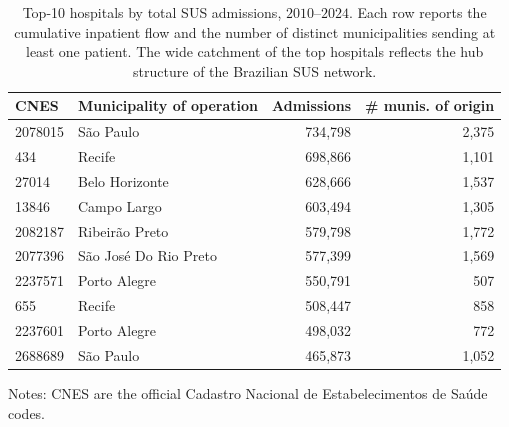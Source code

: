 \begin{table}[ht]
\centering
\caption{Top-10 hospitals by total SUS admissions, $2010\text{--}2024$. Each row reports the cumulative inpatient flow and the number of distinct municipalities sending at least one patient. The wide catchment of the top hospitals reflects the hub structure of the Brazilian SUS network.}
\label{tab:tophosp}
\small
\begin{tabular}{llrr}
\toprule
CNES & Municipality of operation & Admissions & \# munis. of origin \\
\midrule
  2078015 & São Paulo & 734,798 & 2,375 \\
  434 & Recife & 698,866 & 1,101 \\
  27014 & Belo Horizonte & 628,666 & 1,537 \\
  13846 & Campo Largo & 603,494 & 1,305 \\
  2082187 & Ribeirão Preto & 579,798 & 1,772 \\
  2077396 & São José Do Rio Preto & 577,399 & 1,569 \\
  2237571 & Porto Alegre & 550,791 & 507 \\
  655 & Recife & 508,447 & 858 \\
  2237601 & Porto Alegre & 498,032 & 772 \\
  2688689 & São Paulo & 465,873 & 1,052 \\
\bottomrule
\end{tabular}
\medskip

\footnotesize
Notes: CNES are the official Cadastro Nacional de Estabelecimentos de Saúde codes.
\end{table}
